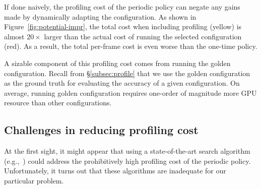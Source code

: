 If done naively, the profiling cost of the periodic policy can negate any gains made by dynamically adapting the configuration. As shown in Figure~\ref{fig:potential-impr}, the total cost when including profiling (yellow) is almost $20\times$ larger than the actual cost of running the selected configuration (red). As a result, the total per-frame cost is even worse than the one-time policy.


A sizable component of this profiling cost comes from running the golden configuration. Recall from \S\ref{subsec:profile} that we use the golden configuration as the ground truth for evaluating the accuracy of a given configuration.
On average, running golden configuration requires one-order of magnitude more GPU resource than other configurations. 

\subsection{Challenges in reducing profiling cost}
At the first sight, it might appear that using a state-of-the-art search algorithm (e.g.,~\cite{cherrypick,amazon-bandit}) could address the prohibitively high profiling cost of the periodic policy. Unfortunately, it turns out that these algorithms are inadequate for our particular problem.

